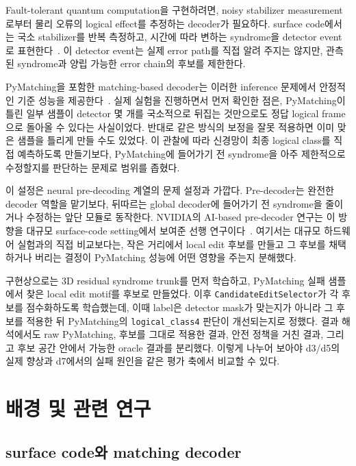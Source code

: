 \documentclass[aps,prd,12pt,twocolumn,superscriptaddress,floatfix,longbibliography]{revtex4-2}
\begin{document}
Fault-tolerant quantum computation을 구현하려면, noisy stabilizer measurement로부터
물리 오류의 logical effect를 추정하는 decoder가 필요하다. surface code에서는 국소
stabilizer를 반복 측정하고, 시간에 따라 변하는 syndrome을 detector event로
표현한다~\cite{surfacecode}. 이 detector event는 실제 error path를 직접 알려
주지는 않지만, 관측된 syndrome과 양립 가능한 error chain의 후보를 제한한다.

PyMatching을 포함한 matching-based decoder는 이러한 inference 문제에서 안정적인
기준 성능을 제공한다~\cite{pymatching}. 실제 실험을 진행하면서 먼저 확인한 점은,
PyMatching이 틀린 일부 샘플이 detector 몇 개를 국소적으로 뒤집는 것만으로도
정답 logical frame으로 돌아올 수 있다는 사실이었다. 반대로 같은 방식의 보정을
잘못 적용하면 이미 맞은 샘플을 틀리게 만들 수도 있었다. 이 관찰에 따라
신경망이 최종 logical class를 직접 예측하도록 만들기보다, PyMatching에 들어가기
전 syndrome을 아주 제한적으로 수정할지를 판단하는 문제로 범위를 좁혔다.

이 설정은 neural pre-decoding 계열의 문제 설정과 가깝다. Pre-decoder는 완전한
decoder 역할을 맡기보다, 뒤따르는 global decoder에 들어가기 전 syndrome을 줄이거나
수정하는 앞단 모듈로 동작한다. NVIDIA의 AI-based pre-decoder 연구는 이 방향을 대규모
surface-code setting에서 보여준 선행 연구이다~\cite{nvidiaising}. 여기서는
대규모 하드웨어 실험과의 직접 비교보다는, 작은 거리에서 local edit 후보를 만들고
그 후보를 채택하거나 버리는 결정이 PyMatching 성능에 어떤 영향을 주는지 분해했다.

구현상으로는 3D residual syndrome trunk를 먼저 학습하고, PyMatching 실패 샘플에서
찾은 local edit motif를 후보로 만들었다. 이후 \texttt{CandidateEditSelector}가
각 후보를 점수화하도록 학습했는데, 이때 label은 detector mask가 맞는지가 아니라
그 후보를 적용한 뒤 PyMatching의 \texttt{logical\_class4} 판단이 개선되는지로
정했다. 결과 해석에서도 raw PyMatching, 후보를 그대로 적용한 결과, 안전 정책을
거친 결과, 그리고 후보 공간 안에서 가능한 oracle 결과를 분리했다. 이렇게 나누어
보아야 d3/d5의 실제 향상과 d7에서의 실패 원인을 같은 평가 축에서 비교할 수 있다.

\section{배경 및 관련 연구}

\subsection{surface code와 matching decoder}
\end{document}
